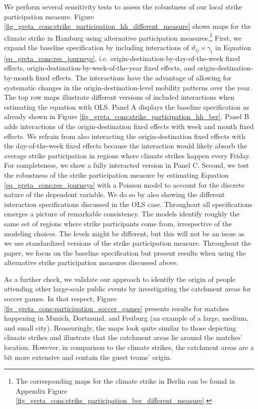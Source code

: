 We perform several sensitivity tests to assess the robustness of our local strike participation measure. Figure \ref{fig_greta_cons:strike_participation_hh_different_measure} shows maps for the climate strike in Hamburg using alternative participation measures.\footnote{The corresponding maps for the climate strike in Berlin can be found in Appendix Figure \ref{fig_greta_cons:strike_participation_ber_different_measure}.} First, we expand the baseline specification by including interactions of $\vartheta_{ij}\times\gamma_t$ in Equation \ref{eq_greta_cons:res_journeys}, i.e. origin-destination-by-day-of-the-week fixed effects, origin-destination-by-week-of-the-year fixed effects, and origin-destination-by-month fixed effects. The interactions have the advantage of allowing for systematic changes in the origin-destination-level mobility patterns over the year. The top row maps illustrate different versions of included interactions when estimating the equation with OLS. Panel A displays the baseline specification as already shown in Figure \ref{fig_greta_cons:strike_participation_hh_ber}. Panel B adds interactions of the origin-destination fixed effects with week and month fixed effects. We refrain from also interacting the origin-destination fixed effects with the day-of-the-week fixed effects because the interaction would likely absorb the average strike participation in regions where climate strikes happen every Friday. For completeness, we show a fully interacted version in Panel C. Second, we test the robustness of the strike participation measure by estimating Equation \ref{eq_greta_cons:res_journeys} with a Poisson model to account for the discrete nature of the dependent variable. We do so by also showing the different interaction specifications discussed in the OLS case. Throughout all specifications emerges a picture of remarkable consistency. The models identify roughly the same set of regions where strike participants come from, irrespective of the modeling choices. The levels might be different, but this will not be an issue as we use standardized versions of the strike participation measure. Throughout the paper, we focus on the baseline specification but present results when using the alternative strike participation measures discussed above.



As a further check, we validate our approach to identify the origin of people attending other large-scale public events by investigating the catchment areas for soccer games. In that respect, Figure \ref{fig_greta_cons:participation_soccer_games} presents results for matches happening in Munich, Dortmund, and Freiburg (an example of a large, medium, and small city). Reassuringly, the maps look quite similar to those depicting climate strikes and illustrate that the catchment areas lie around the matches' location. However, in comparison to the climate strikes, the catchment areas are a bit more extensive and contain the guest teams' origin.







